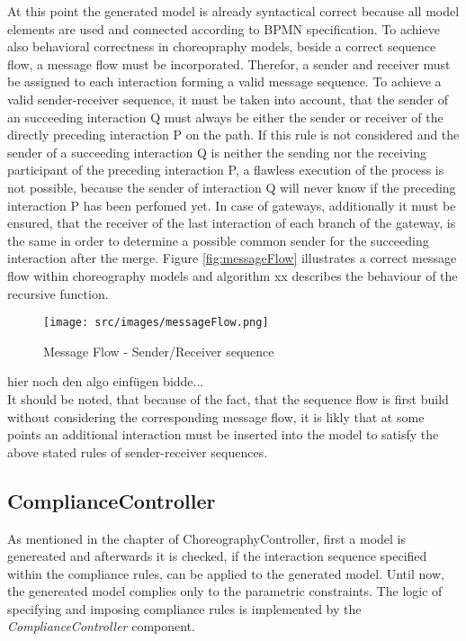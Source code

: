 At this point the generated model is already syntactical correct because all model elements are used and connected according to BPMN specification. To achieve also behavioral correctness in choreopraphy models, beside a correct sequence flow, a message flow must be incorporated. Therefor, a sender and receiver must be assigned to each interaction forming a valid message sequence. To achieve a valid sender-receiver sequence, it must be taken into account, that the sender of an succeeding interaction Q must always be either the sender or receiver of the directly preceding interaction P on the path. If this rule is not considered and the sender of a succeeding interaction Q is neither the sending nor the receiving participant of the preceding interaction P, a flawless execution of the process is not possible, because the sender of interaction Q will never know if the preceding interaction P has been perfomed yet. In case of gateways, additionally it must be ensured, that the receiver of the last interaction of each branch of the gateway, is the same in order to determine a possible common sender for the succeeding interaction after the merge. Figure \ref{fig:messageFlow} illustrates a correct message flow within choreography models and algorithm xx describes the behaviour of the recursive function.  

\begin{figure}[H]
\texttt{[image: src/images/messageFlow.png]}
\caption{Message Flow - Sender/Receiver sequence}
\label{fig:messageflow}
\end{figure}

hier noch den algo einfügen bidde...\\
It should be noted, that because of the fact, that the sequence flow is first build without considering the corresponding message flow, it is likly that at some points an additional interaction must be inserted into the model to satisfy the above stated rules of sender-receiver sequences.


\subsection{ComplianceController}
As mentioned in the chapter of ChoreographyController, first a model is genereated and afterwards it is checked, if the interaction sequence specified within the compliance rules, can be applied to the generated model. Until now, the genereated model complies only to the parametric constraints. The logic of specifying and imposing compliance rules is implemented by the \textit{ComplianceController} component.\\

